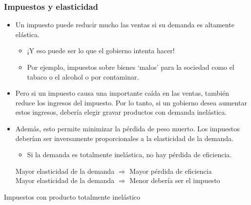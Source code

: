 \documentclass{beamer}
\begin{document}
\begin{frame}
\frametitle{Impuestos y elasticidad}
\begin{itemize}
    \item Un impuesto puede reducir mucho las ventas si su demanda es altamente elástica.
    \begin{itemize}
        \item ¡Y eso puede ser lo que el gobierno intenta hacer!
        \item Por ejemplo, impuestos sobre bienes ‘malos’ para la sociedad como el tabaco o el alcohol o por contaminar.
    \end{itemize}
    \vspace{1mm}
    \item Pero si un impuesto causa una importante caída en las ventas, también reduce los ingresos del impuesto. Por lo tanto, si un gobierno desea aumentar estos ingresos, debería elegir gravar productos con demanda inelástica. 
    \vspace{1mm}
    \item Además, esto permite minimizar la pérdida de peso muerto. Los impuestos deberían ser inversamente proporcionales a la elasticidad de la demanda.
        \begin{itemize}
        \item Si la demanda es totalmente inelástica, no hay pérdida de eficiencia. 
        \end{itemize}
    \begin{boxB}
    \centering
    \small
    Mayor elasticidad de la demanda $\Longrightarrow$ Mayor pérdida de eficiencia \\
    Mayor elasticidad de la demanda $\Longrightarrow$ Menor debería ser el impuesto
    \end{boxB}
\end{itemize}
\end{frame}

\begin{frame}{Impuestos con producto totalmente inelástico}

\begin{figure} [H]
    \centering
{}
\end{figure} 

\end{frame}
\end{document}
